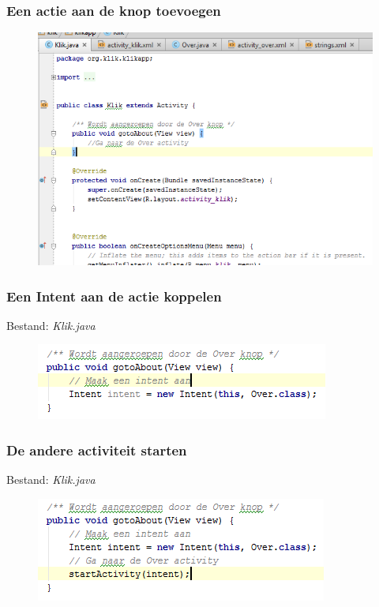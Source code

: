 \documentclass[11pt]{beamer}
\begin{document}
\begin{frame}
\frametitle{Een actie aan de knop toevoegen}
\begin{figure}
\centering
\includegraphics[height=.9\textheight]{./intent2}
\label{fig:intent2}
\end{figure}
\end{frame}

\begin{frame}
\frametitle{Een Intent aan de actie koppelen}
Bestand: \textit{Klik.java}
\begin{figure}
\centering
\includegraphics[width=.9\linewidth]{./intent3}
\label{fig:intent3}
\end{figure}
\end{frame}

\begin{frame}
\frametitle{De andere activiteit starten}
Bestand: \textit{Klik.java}
\begin{figure}
\centering
\includegraphics[width=.9\linewidth]{./intent4}
\label{fig:intent4}
\end{figure}
\end{frame}






%
%
%
%
\end{document}
